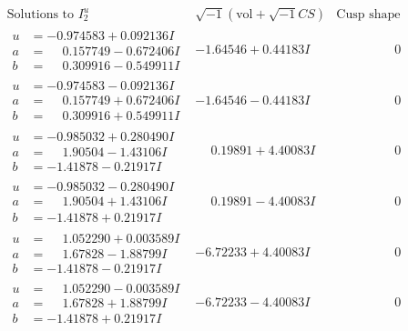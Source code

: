 \documentclass[1p]{elsarticle_modified}
\theoremstyle{definition}
\newcommand{\I}{\sqrt{-1}}
\begin{document}
$$\begin{array}{c|c|c}  
\text{Solutions to }I^u_{2}& \I (\text{vol} + \sqrt{-1}CS) & \text{Cusp shape}\\
 \hline 
\begin{aligned}
u &= -0.974583 + 0.092136 I \\
a &= \phantom{-}0.157749 - 0.672406 I \\
b &= \phantom{-}0.309916 - 0.549911 I\end{aligned}
 & -1.64546 + 0.44183 I & \phantom{-0.000000 } 0 \\ \hline\begin{aligned}
u &= -0.974583 - 0.092136 I \\
a &= \phantom{-}0.157749 + 0.672406 I \\
b &= \phantom{-}0.309916 + 0.549911 I\end{aligned}
 & -1.64546 - 0.44183 I & \phantom{-0.000000 } 0 \\ \hline\begin{aligned}
u &= -0.985032 + 0.280490 I \\
a &= \phantom{-}1.90504 - 1.43106 I \\
b &= -1.41878 - 0.21917 I\end{aligned}
 & \phantom{-}0.19891 + 4.40083 I & \phantom{-0.000000 } 0 \\ \hline\begin{aligned}
u &= -0.985032 - 0.280490 I \\
a &= \phantom{-}1.90504 + 1.43106 I \\
b &= -1.41878 + 0.21917 I\end{aligned}
 & \phantom{-}0.19891 - 4.40083 I & \phantom{-0.000000 } 0 \\ \hline\begin{aligned}
u &= \phantom{-}1.052290 + 0.003589 I \\
a &= \phantom{-}1.67828 - 1.88799 I \\
b &= -1.41878 - 0.21917 I\end{aligned}
 & -6.72233 + 4.40083 I & \phantom{-0.000000 } 0 \\ \hline\begin{aligned}
u &= \phantom{-}1.052290 - 0.003589 I \\
a &= \phantom{-}1.67828 + 1.88799 I \\
b &= -1.41878 + 0.21917 I\end{aligned}
 & -6.72233 - 4.40083 I & \phantom{-0.000000 } 0 \\ \hline\begin{aligned}

\end{aligned}
\end{array}$$
\end{document}
